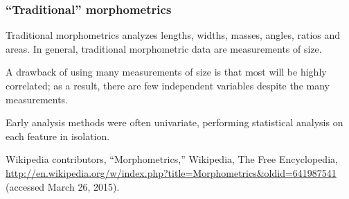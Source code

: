\begin{frame}
\frametitle{``Traditional'' morphometrics}
Traditional morphometrics analyzes lengths, widths, masses, angles, ratios and areas.
In general, traditional morphometric data are measurements of size.

A drawback of using many measurements of size is that most will be highly correlated; as a result, there are few independent variables despite the many measurements.

Early analysis methods were often univariate, performing statistical analysis on each feature in isolation.

\vspace{0.25cm}
\begin{tiny}
Wikipedia contributors, ``Morphometrics,'' Wikipedia, The Free Encyclopedia, \url{http://en.wikipedia.org/w/index.php?title=Morphometrics&oldid=641987541} (accessed March 26, 2015).\par
\end{tiny}
\end{frame}


